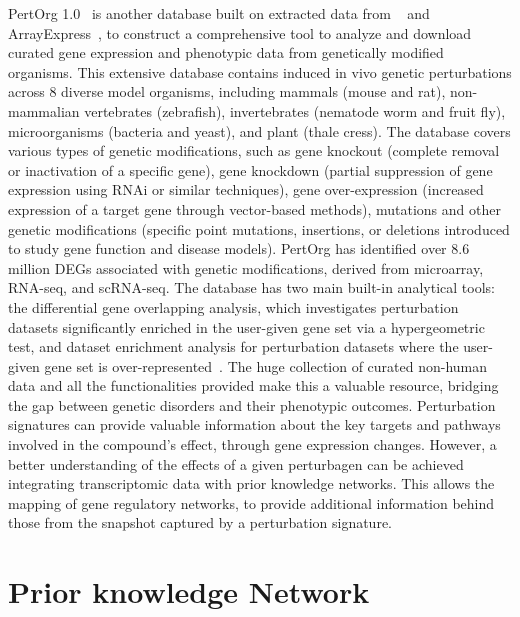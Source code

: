 PertOrg 1.0~\cite{RN85} is another database built on extracted data from ~\cite{RN98} and ArrayExpress~\cite{RN122}, to construct a comprehensive tool to analyze and download curated gene expression and phenotypic data from genetically modified organisms. 
This extensive database contains induced in vivo genetic perturbations across 8 diverse model organisms, including mammals (mouse and rat), non-mammalian vertebrates (zebrafish), invertebrates (nematode worm and fruit fly), microorganisms (bacteria and yeast), and plant (thale cress). The database covers various types of genetic modifications, such as gene knockout (complete removal or inactivation of a specific gene), gene knockdown (partial suppression of gene expression using \gls{RNA}i or similar techniques), gene over-expression (increased expression of a target gene through vector-based methods), mutations and other genetic modifications (specific point mutations, insertions, or deletions introduced to study gene function and disease models). 
PertOrg has identified over 8.6 million \gls{DEGs} associated with genetic modifications, derived from microarray, RNA-seq, and scRNA-seq. 
The database has two main built-in analytical tools: the differential gene overlapping analysis, which investigates perturbation datasets significantly enriched in the user-given gene set via a hypergeometric test, and dataset enrichment analysis for perturbation datasets where the user-given gene set is over-represented~\cite{RN85}. 
The huge collection of curated non-human data and all the functionalities provided make this a valuable resource, bridging the gap between genetic disorders and their phenotypic outcomes.
Perturbation signatures can provide valuable information about the key targets and pathways involved in the compound's effect, through gene expression changes. 
However, a better understanding of the effects of a given perturbagen can be achieved integrating transcriptomic data with prior knowledge networks. This allows the mapping of gene regulatory networks, to provide additional information behind those from the snapshot captured by a perturbation signature. 


\section{Prior knowledge Network} %
\label{sec:Prior_knowledge_Network}

